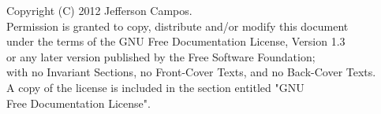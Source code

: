 \documentclass[a4paper,12pt]{article}
\begin{document}
Copyright (C) 2012 Jefferson Campos.\\
Permission is granted to copy, distribute and/or modify this document\\
under the terms of the GNU Free Documentation License, Version 1.3\\
or any later version published by the Free Software Foundation;\\
with no Invariant Sections, no Front-Cover Texts, and no Back-Cover Texts.\\
A copy of the license is included in the section entitled "GNU\\
Free Documentation License".

\nocite{texbook:STEWART}


\end{document}
